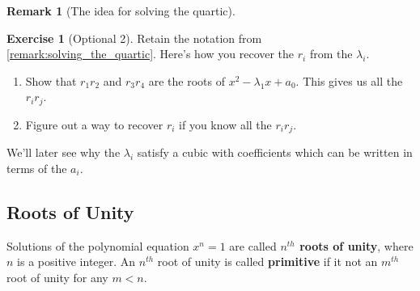 \documentclass[reqno, 12pt, letter]{article}
\theoremstyle{plain}
\theoremstyle{definition}
\newtheorem{remark}[theorem]{Remark}
\newtheorem{exercise}[theorem]{Exercise}
\theoremstyle{remark}
\numberwithin{equation}{section}
\begin{document}
\begin{remark}[The idea for solving the quartic]
	\begin{exercise}[Optional 2]
		Retain the notation from \autoref{remark:solving_the_quartic}.
		Here's how you recover the $ r_i$ from the $ \lambda_i$.
		\begin{enumerate}
			\item Show that $ r_1 r_2$ and $r_3 r_4$ are the roots of $ x^2 - \lambda_1 x + a_0$. This gives us all the $ r_i r_j$.
			\item Figure out a way to recover $ r_i$ if you know all the $ r_i r_j$.
		\end{enumerate}
	\end{exercise}
	We'll later see why the $ \lambda_i$ satisfy a cubic with coefficients which can be written in terms of the $ a_i$.
\end{remark}

\subsection{Roots of Unity}


Solutions of the polynomial equation $ x^n = 1$ are called \textbf{$n^{th}$ roots of unity}, where $ n$ is a positive integer. An $ n^{th}$ root of unity is called \textbf{primitive} if it not an $ m^{th}$ root of unity for any $ m < n$.
\end{document}
